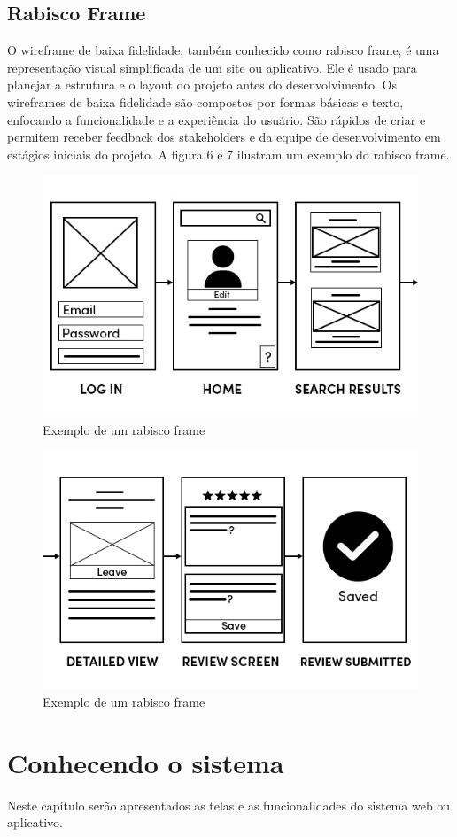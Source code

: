 \documentclass[12pt]{article}
\begin{document}
\subsection{Rabisco Frame}
O wireframe de baixa fidelidade, também conhecido como rabisco frame, é uma representação visual simplificada de um site ou aplicativo. Ele é usado para planejar a estrutura e o layout do projeto antes do desenvolvimento. Os wireframes de baixa fidelidade são compostos por formas básicas e texto, enfocando a funcionalidade e a experiência do usuário. São rápidos de criar e permitem receber feedback dos stakeholders e da equipe de desenvolvimento em estágios iniciais do projeto. A figura 6 e 7 ilustram um exemplo do rabisco frame. 
\begin{figure}[H]
\centering
\includegraphics[width=.8\textwidth]{frame1.png}
\caption{Exemplo de um rabisco frame}
\label{fig:typical-figure}
\end{figure}

\begin{figure}[H]
\centering
\includegraphics[width=.8\textwidth]{frame2.png}
\caption{Exemplo de um rabisco frame}
\label{fig:typical-figure}
\end{figure}

\section{Conhecendo o sistema}
Neste capítulo serão apresentados as telas e as funcionalidades do sistema
web ou aplicativo.
\end{document}
